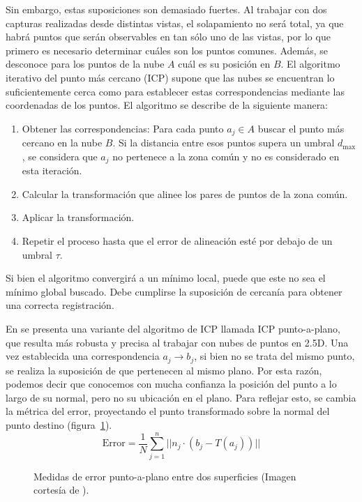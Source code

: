 Sin embargo, estas suposiciones son demasiado fuertes.
Al trabajar con dos capturas realizadas desde distintas vistas, el solapamiento no será total,
ya que habrá puntos que serán observables en tan sólo uno de las vistas,
por lo que primero es necesario determinar cuáles son los puntos comunes.
Además, se desconoce para los puntos de la nube $A$ cuál es su posición en $B$.
El algoritmo iterativo del punto más cercano (ICP) supone que las nubes se encuentran
lo suficientemente cerca como para establecer estas correspondencias mediante las coordenadas de los puntos.
El algoritmo se describe de la siguiente manera:
\begin{enumerate}
	\item Obtener las correspondencias:
		Para cada punto $a_j \in A$ buscar el punto más cercano en la nube $B$.
		Si la distancia entre esos puntos supera un umbral $d_{\text{max}}$,
		se considera que $a_j$ no pertenece a la zona común y no es considerado en esta iteración.
	\item Calcular la transformación que alinee los pares de puntos de la zona común.
	\item Aplicar la transformación.
	\item Repetir el proceso hasta que el error de alineación esté por debajo de un umbral $\tau$.
\end{enumerate}%
Si bien el algoritmo convergirá a un mínimo local, puede que este no sea el mínimo global buscado.
Debe cumplirse la suposición de cercanía para obtener una correcta registración.\cite{regBesl92}

En \cite{chen-medoni} se presenta una variante del algoritmo de ICP llamada ICP punto-a-plano,
que resulta más robusta y precisa al trabajar con nubes de puntos en 2.5D. 
Una vez establecida una correspondencia $a_j \to b_j$, si bien no se trata del mismo punto,
se realiza la suposición de que pertenecen al mismo plano.
Por esta razón, podemos decir que conocemos con mucha confianza la posición del punto
a lo largo de su normal, pero no su ubicación en el plano.
Para reflejar esto, se cambia la métrica del error, proyectando el punto transformado sobre la normal
del punto destino (figura~\ref{fig:point_to_plane}).
\[
	\text{Error} = \frac{1}{N} \sum_{j=1}^n || n_j \cdot \left( b_j - T \left(a_j\right) \right) ||
\]

\begin{figure}
	\centering
	
	\caption{\label{fig:point_to_plane}Medidas de error punto-a-plano entre dos superficies
	(Imagen cortesía de \cite{icp_point_to_plane}).}
\end{figure}

\endinput
